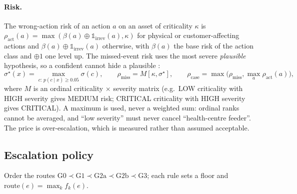 \paragraph{Risk.} The wrong-action risk of an action $a$ on an asset of criticality $\kappa$ is
$\rho_{\mathrm{act}}(a)=\max(\beta(a)\oplus\mathbb 1_{\mathrm{irrev}}(a),\kappa)$ for physical or customer-affecting
actions and $\beta(a)\oplus\mathbb 1_{\mathrm{irrev}}(a)$ otherwise, with $\beta(a)$ the base risk of the action
class and $\oplus1$ one level up. The missed-event risk uses the most severe \emph{plausible} hypothesis, so a
confident \MF{} cannot hide a plausible \GE:
\begin{equation}
\sigma^\star(x)=\max_{c:\,p(c\mid x)\ge0.05}\sigma(c),\qquad \rho_{\mathrm{miss}}=M[\kappa,\sigma^\star],\qquad
\rho_{\mathrm{case}}=\max\bigl(\rho_{\mathrm{miss}},\max_a\rho_{\mathrm{act}}(a)\bigr),
\end{equation}
where $M$ is an ordinal criticality $\times$ severity matrix (e.g.\ LOW criticality with HIGH severity gives
MEDIUM risk; CRITICAL criticality with HIGH severity gives CRITICAL). A maximum is used, never a weighted sum:
ordinal ranks cannot be averaged, and ``low severity'' must never cancel ``health-centre feeder''. The price is
over-escalation, which is measured rather than assumed acceptable.

\subsection{Escalation policy}
Order the routes $\mathrm{G0}\prec\mathrm{G1}\prec\mathrm{G2a}\prec\mathrm{G2b}\prec\mathrm{G3}$; each rule sets a
floor and $\mathrm{route}(e)=\max_k f_k(e)$.

